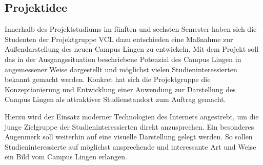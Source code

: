 \subsection{Projektidee}
\label{sec:Projektidee}

Innerhalb des Projektstudiums im fünften und sechsten Semester haben sich die
Studenten der Projektgruppe \acs{VCL} dazu entschieden eine
Maßnahme zur Außendarstellung des neuen Campus Lingen zu entwickeln. Mit dem
Projekt soll das in der Ausgangssituation beschriebene Potenzial des Campus
Lingen in angemessener Weise dargestellt und möglichst vielen
Studieninteressierten bekannt gemacht werden. Konkret hat sich die Projektgruppe
die Konzeptionierung und Entwicklung einer Anwendung zur Darstellung
des Campus Lingen als attraktiver Studienstandort zum Auftrag gemacht. 

Hierzu wird der Einsatz moderner Technologien des Internets angestrebt, um
die junge Zielgruppe der Studieninteressierten direkt anzusprechen. Ein besonderes
Augenmerk soll weiterhin auf eine visuelle Darstellung gelegt werden. So sollen
Studieninteressierte auf möglichst ansprechende und interessante Art und Weise
ein Bild vom Campus Lingen erlangen.
